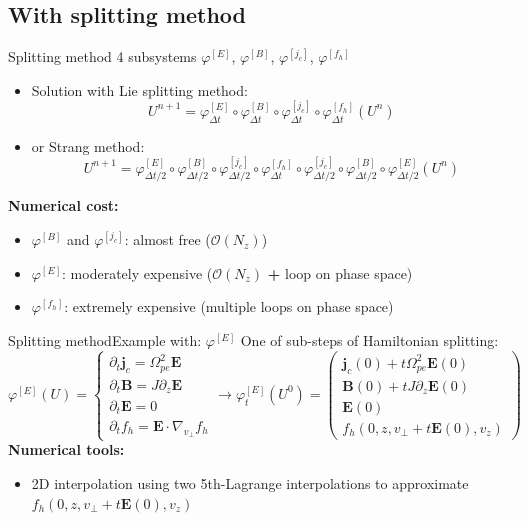 \documentclass{beamer}
\newcommand{\mbold}[1]{{\textbf{\color{PLB}#1}}}
\newcommand{\Mvb}[1]{\boldsymbol{#1}}
\begin{document}
\subsection{With splitting method}
\begin{frame}{Splitting method}
  4 subsystems $\varphi^{[E]}$, $\varphi^{[B]}$, $\varphi^{[j_c]}$, $\varphi^{[f_h]}$


  \begin{itemize}
    \item Solution with Lie splitting method:
      $$
        U^{n+1} = \varphi_{\Delta t}^{[E]}
            \circ \varphi_{\Delta t}^{[B]}
            \circ \varphi_{\Delta t}^{[j_c]}
            \circ \varphi_{\Delta t}^{[f_h]} (U^n)
      $$
    \item or Strang method:
      $$
        U^{n+1} = \varphi_{\Delta t/2}^{[E]}
            \circ \varphi_{\Delta t/2}^{[B]}
            \circ \varphi_{\Delta t/2}^{[j_c]}
            \circ \varphi_{\Delta t}^{[f_h]}
            \circ \varphi_{\Delta t/2}^{[j_c]}
            \circ \varphi_{\Delta t/2}^{[B]}
            \circ \varphi_{\Delta t/2}^{[E]} (U^n)
      $$
  \end{itemize}

  \mbold{Numerical cost:}
  \begin{itemize}
    \item $\varphi^{[B]}$ and $\varphi^{[j_c]}$: almost free ($\mathcal{O}(N_z)$)
    \item $\varphi^{[E]}$: moderately expensive ($\mathcal{O}(N_z)$ \mbold{+} loop on phase space)
    \item $\varphi^{[f_h]}$: extremely expensive (multiple loops on phase space)
  \end{itemize}
\end{frame}
\begin{frame}{Splitting method}{Example with: $\varphi^{[E]}$}
  One of sub-steps of Hamiltonian splitting:
  $$
    \varphi^{[E]}(U) =
    \begin{cases}
      \partial_t \Mvb{j}_c = \Omega_{pe}^2\Mvb{E} \\
      \partial_t \Mvb{B} = J\partial_z\Mvb{E} \\
      \partial_t \Mvb{E} = 0 \\
      \partial_t f_h = \Mvb{E}\cdot\nabla_{v_\perp}f_h
    \end{cases}
    \rightarrow
    \varphi_{t}^{[E]}(U^0) = \begin{pmatrix}
      \Mvb{j}_c(0) + t\Omega_{pe}^2\Mvb{E}(0) \\
      \Mvb{B}(0) + tJ\partial_z\Mvb{E}(0) \\
      \Mvb{E}(0) \\
      f_h(0,z,v_\perp\!+t\Mvb{E}(0),v_z)
    \end{pmatrix}
  $$
  \mbold{Numerical tools:}
  \begin{itemize}
    \item 2D interpolation using two 5th-Lagrange interpolations to approximate $f_h(0,z,v_\perp+t\Mvb{E}(0),v_z)$
  \end{itemize}
\end{frame}
\end{document}
